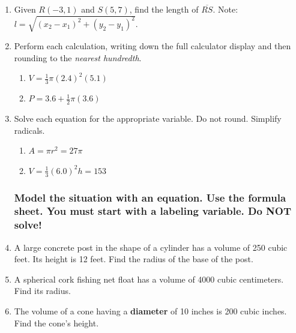 \documentclass[12pt, twoside]{article}
\begin{document}
\begin{enumerate}
  \item Given $R(-3,1)$ and $S(5,7)$, find the length of $\overline{RS}$. Note: $l=\sqrt{(x_2-x_1)^2+(y_2-y_1)^2}$. %
  
\newpage
  \item Perform each calculation, writing down the full calculator display and then rounding to the \emph{nearest hundredth}.
  \begin{multicols}{2}
  \begin{enumerate}
    \item $V=\frac{1}{3} \pi (2.4)^2(5.1)$
    \item $P=3.6 + \frac{1}{2} \pi (3.6)$  
  \end{enumerate}
  \end{multicols}\vspace{2cm}

  \item Solve each equation for the appropriate variable. Do not round. Simplify radicals.
  \begin{multicols}{2}
  \begin{enumerate}[itemsep=2cm]
    \item $A=\pi r^2=27\pi$
    \item $V=\frac{1}{3}(6.0)^2h=153$  
  \end{enumerate}
  \end{multicols}\vspace{5cm}

  \subsubsection*{Model the situation with an equation. Use the formula sheet. You must start with a labeling variable. \hfill Do NOT solve!}

  \item A large concrete post in the shape of a cylinder has a volume of 250 cubic feet. Its height is 12 feet. Find the radius of the base of the post. \vspace{2cm}

  \item A spherical cork fishing net float has a volume of 4000 cubic centimeters. Find its radius. \vspace{2cm}

  \item The volume of a cone having a \textbf{diameter} of 10 inches is 200 cubic inches. Find the cone's height. \vspace{2cm}


\end{enumerate}
\end{document}

